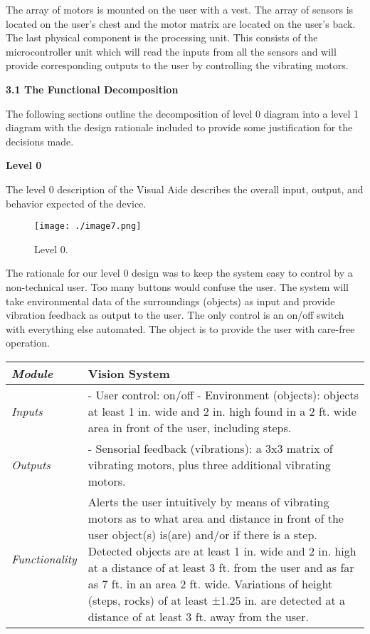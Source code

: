 The array of motors is mounted on the user with a vest. The array of
sensors is located on the user's chest and the motor matrix are located
on the user's back. The last physical component is the processing unit.
This consists of the microcontroller unit which will read the inputs
from all the sensors and will provide corresponding outputs to the user
by controlling the vibrating motors.


\textbf{3.1 The Functional Decomposition}


The following sections outline the decomposition of level 0 diagram into
a level 1 diagram with the design rationale included to provide some
justification for the decisions made.



\textbf{Level 0}

The level 0 description of the Visual Aide describes the overall input,
output, and behavior expected of the device.

\begin{figure}[h]
\centering
\texttt{[image: ./image7.png]}
\caption{Level 0.}
\label{figure:caseStudyLevel0}
\end{figure}


The rationale for our level 0 design was to keep the system easy to
control by a non-technical user. Too many buttons would confuse the
user. The system will take environmental data of the surroundings
(objects) as input and provide vibration feedback as output to the user.
The only control is an on/off switch with everything else automated. The
object is to provide the user with care-free operation.


\begin{table}[h]

\label{table:caseStudyLevel0}
\begin{tabular}{|p{2cm}|p{10cm}|} \hline

\emph{Module} & Vision System \\ \hline

\emph{Inputs} & - User control: on/off
- Environment (objects): objects at least 1 in. wide and 2 in. high
found in a 2 ft. wide area in front of the user, including steps. \\ \hline

\emph{Outputs} & - Sensorial feedback (vibrations): a 3x3 matrix of
vibrating motors, plus three additional vibrating motors. \\ \hline

\emph{Functionality} & Alerts the user intuitively by means of vibrating
motors as to what area and distance in front of the user object(s)
is(are) and/or if there is a step. Detected objects are at least 1 in.
wide and 2 in. high at a distance of at least 3 ft. from the user and as
far as 7 ft. in an area 2 ft. wide. Variations of height (steps, rocks)
of at least ±1.25 in. are detected at a distance of at least 3 ft. away
from the user. \\ \hline
\end{tabular}
\end{table}

